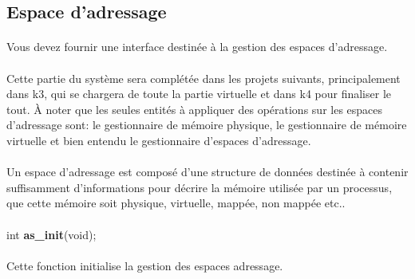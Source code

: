 \documentclass[10pt,a4wide]{article}
\begin{document}
\subsection{Espace d'adressage}

\paragraph{}

Vous devez fournir une interface destin\'ee \`a la gestion des
espaces d'adressage.

\paragraph{}

Cette partie du syst\`eme sera compl\'et\'ee dans les projets suivants,
principalement dans k3, qui se chargera de toute la partie virtuelle et dans
k4 pour finaliser le tout. \`A noter que les seules entit\'es \`a appliquer
des op\'erations sur les espaces d'adressage sont: le gestionnaire de m\'emoire
physique, le gestionnaire de m\'emoire virtuelle et bien entendu le
gestionnaire d'espaces d'adressage.

\paragraph{}

Un espace d'adressage est compos\'e d'une structure de donn\'ees destin\'ee
\`a contenir suffisamment d'informations pour d\'ecrire la m\'emoire
utilis\'ee par un processus, que cette m\'emoire soit physique, virtuelle,
mapp\'ee, non mapp\'ee etc..

\paragraph{}

\hspace{1.5cm}int \textbf{as\_init}(void);

\paragraph{}

Cette fonction initialise la gestion des espaces adressage.

\paragraph{}
\end{document}
